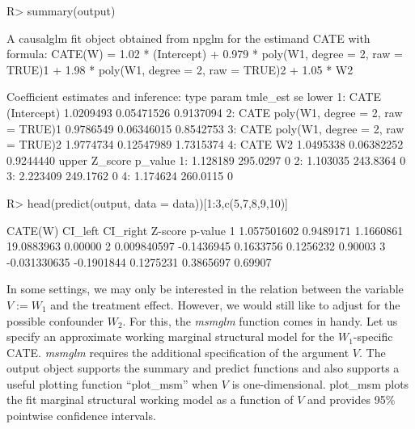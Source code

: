\documentclass[
]{jss}
\begin{document}
\begin{CodeChunk}
\begin{CodeInput}
R> summary(output)
\end{CodeInput}
\begin{CodeOutput}
A causalglm fit object obtained from npglm for the estimand CATE with formula: 
CATE(W) = 1.02 * (Intercept) + 0.979 * poly(W1, degree = 2, raw = TRUE)1 + 1.98 * poly(W1, degree = 2, raw = TRUE)2 + 1.05 * W2

Coefficient estimates and inference:
   type                             param  tmle_est         se     lower
1: CATE                       (Intercept) 1.0209493 0.05471526 0.9137094
2: CATE poly(W1, degree = 2, raw = TRUE)1 0.9786549 0.06346015 0.8542753
3: CATE poly(W1, degree = 2, raw = TRUE)2 1.9774734 0.12547989 1.7315374
4: CATE                                W2 1.0495338 0.06382252 0.9244440
      upper  Z_score p_value
1: 1.128189 295.0297       0
2: 1.103035 243.8364       0
3: 2.223409 249.1762       0
4: 1.174624 260.0115       0
\end{CodeOutput}
\begin{CodeInput}
R> head(predict(output, data = data))[1:3,c(5,7,8,9,10)]
\end{CodeInput}
\begin{CodeOutput}
       CATE(W)    CI_left  CI_right    Z-score p-value
1  1.057501602  0.9489171 1.1660861 19.0883963 0.00000
2  0.009840597 -0.1436945 0.1633756  0.1256232 0.90003
3 -0.031330635 -0.1901844 0.1275231  0.3865697 0.69907
\end{CodeOutput}
\end{CodeChunk}

In some settings, we may only be interested in the relation between the
variable \(V := W_1\) and the treatment effect. However, we would still
like to adjust for the possible confounder \(W_2\). For this, the
\textit{msmglm} function comes in handy. Let us specify an approximate
working marginal structural model for the \(W_1\)-specific CATE.
\textit{msmglm} requires the additional specification of the argument
\(V\). The output object supports the summary and predict functions and
also supports a useful plotting function ``plot\_msm'' when \(V\) is
one-dimensional. plot\_msm plots the fit marginal structural working
model as a function of \(V\) and provides 95\% pointwise confidence
intervals.
\end{document}
